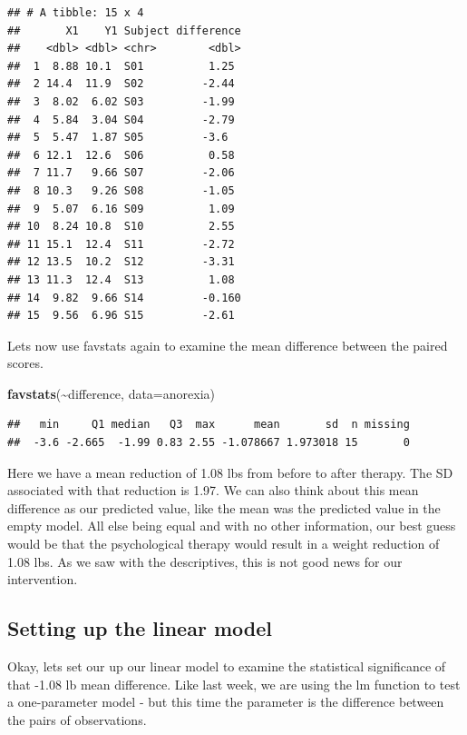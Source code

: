 \documentclass[
]{article}
\newenvironment{Shaded}{\begin{snugshade}}{\end{snugshade}}
\newcommand{\AttributeTok}[1]{\textcolor[rgb]{0.13,0.29,0.53}{#1}}
\newcommand{\FunctionTok}[1]{\textcolor[rgb]{0.13,0.29,0.53}{\textbf{#1}}}
\newcommand{\NormalTok}[1]{#1}
\newcommand{\SpecialCharTok}[1]{\textcolor[rgb]{0.81,0.36,0.00}{\textbf{#1}}}
\begin{document}
\begin{verbatim}
## # A tibble: 15 x 4
##       X1    Y1 Subject difference
##    <dbl> <dbl> <chr>        <dbl>
##  1  8.88 10.1  S01          1.25 
##  2 14.4  11.9  S02         -2.44 
##  3  8.02  6.02 S03         -1.99 
##  4  5.84  3.04 S04         -2.79 
##  5  5.47  1.87 S05         -3.6  
##  6 12.1  12.6  S06          0.58 
##  7 11.7   9.66 S07         -2.06 
##  8 10.3   9.26 S08         -1.05 
##  9  5.07  6.16 S09          1.09 
## 10  8.24 10.8  S10          2.55 
## 11 15.1  12.4  S11         -2.72 
## 12 13.5  10.2  S12         -3.31 
## 13 11.3  12.4  S13          1.08 
## 14  9.82  9.66 S14         -0.160
## 15  9.56  6.96 S15         -2.61
\end{verbatim}

Lets now use favstats again to examine the mean difference between the
paired scores.

\begin{Shaded}
\begin{Highlighting}[]
\FunctionTok{favstats}\NormalTok{(}\SpecialCharTok{\textasciitilde{}}\NormalTok{difference, }\AttributeTok{data=}\NormalTok{anorexia)}
\end{Highlighting}
\end{Shaded}

\begin{verbatim}
##   min     Q1 median   Q3  max      mean       sd  n missing
##  -3.6 -2.665  -1.99 0.83 2.55 -1.078667 1.973018 15       0
\end{verbatim}

Here we have a mean reduction of 1.08 lbs from before to after therapy.
The SD associated with that reduction is 1.97. We can also think about
this mean difference as our predicted value, like the mean was the
predicted value in the empty model. All else being equal and with no
other information, our best guess would be that the psychological
therapy would result in a weight reduction of 1.08 lbs. As we saw with
the descriptives, this is not good news for our intervention.

\subsection{Setting up the linear
model}\label{setting-up-the-linear-model}

Okay, lets set our up our linear model to examine the statistical
significance of that -1.08 lb mean difference. Like last week, we are
using the lm function to test a one-parameter model - but this time the
parameter is the difference between the pairs of observations.
\end{document}
